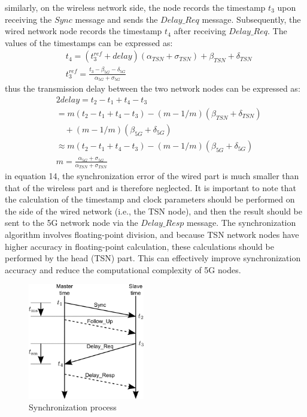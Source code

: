 \documentclass[english]{cccconf}
\begin{document}
similarly, on the wireless network side, the node records the timestamp $t_3$ upon receiving the $Sync$ message and sends the  $Delay\_Req$ message. Subsequently, the wired network node records the timestamp $t_4$ after receiving  $Delay\_Req$. The values of the timestamps can be expressed as:
\begin{equation}
	\begin{split}
		&t_{4}=(t_3^{ref}+delay)(\alpha_{TSN}+\sigma_{TSN})+\beta_{TSN}+\delta_{TSN} \\
		&t_3^{ref}=\frac{t_{3}-\beta_{5G}-\delta_{5G}}{\alpha_{5G}+\sigma_{5G}}
	\end{split}
\end{equation}
thus the transmission delay between the two network nodes can be expressed as:
\begin{equation}
	\begin{split}
		&2  delay =t_{2}-t_{1}+t_{4}-t_{3} \\
		&=m\left(t_{2}-t_{1}+t_{4}-t_{3}\right)-(m-1 / m)\left(\beta_{TSN}+\delta_{TSN}\right)\\
		&\quad+(m-1 / m)\left(\beta_{5G}+\delta_{5G}\right)\\
		& \approx m\left(t_{2}-t_{1}+t_{4}-t_{3}\right)-(m-1 / m)\left(\beta_{5G}+\delta_{5G}\right)\\
		&m=\frac{\alpha_{5G}+\sigma_{5G}}{\alpha_{TSN}+\sigma_{TSN}}		
	\end{split}
\end{equation}
in equation 14, the synchronization error of the wired part is much smaller than that of the wireless part and is therefore neglected. It is important to note that the calculation of the timestamp and clock parameters should be performed on the side of the wired network (i.e., the TSN node), and then the result should be sent to the 5G network node via the $Delay\_Resp$ message. The synchronization algorithm involves floating-point division, and because TSN network nodes have higher accuracy in floating-point calculation, these calculations should be performed by the head (TSN) part. This can effectively improve synchronization accuracy and reduce the computational complexity of 5G nodes.

\begin{figure}[htbp]
	\centering
	\setcounter{figure}{5}
	\includegraphics[width=2in]{fig10.png}
	\caption{Synchronization process}
\end{figure}
\end{document}

